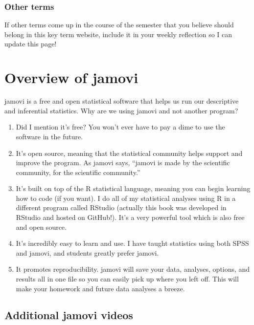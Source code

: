 \documentclass[
]{book}
\begin{document}
\hypertarget{other-terms}{%
\subsection{Other terms}\label{other-terms}}

If other terms come up in the course of the semester that you believe should belong in this key term website, include it in your weekly reflection so I can update this page!

\hypertarget{overview-of-jamovi}{%
\chapter{Overview of jamovi}\label{overview-of-jamovi}}

jamovi is a free and open statistical software that helps us run our descriptive and inferential statistics. Why are we using jamovi and not another program?

\begin{enumerate}
\def\labelenumi{\arabic{enumi}.}
\item
  Did I mention it's free? You won't ever have to pay a dime to use the software in the future.
\item
  It's open source, meaning that the statistical community helps support and improve the program. As jamovi says, ``jamovi is made by the scientific community, for the scientific community.''
\item
  It's built on top of the R statistical language, meaning you can begin learning how to code (if you want). I do all of my statistical analyses using R in a different program called RStudio (actually this book was developed in RStudio and hosted on GitHub!). It's a very powerful tool which is also free and open source.
\item
  It's incredibly easy to learn and use. I have taught statistics using both SPSS and jamovi, and students greatly prefer jamovi.
\item
  It promotes reproducibility. jamovi will save your data, analyses, options, and results all in one file so you can easily pick up where you left off. This will make your homework and future data analyses a breeze.
\end{enumerate}

\hypertarget{additional-jamovi-videos}{%
\section{Additional jamovi videos}\label{additional-jamovi-videos}}
\end{document}

